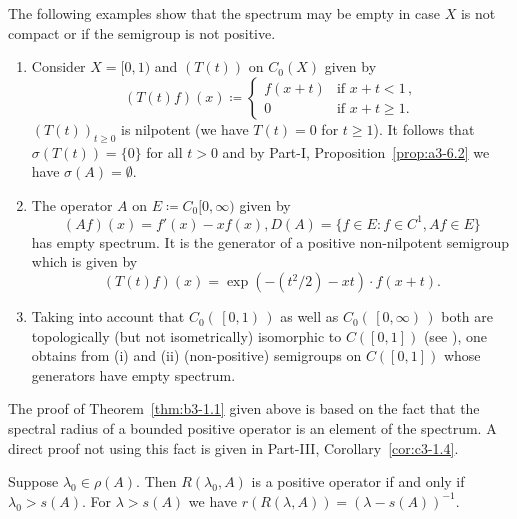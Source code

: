 The following examples show that the spectrum may be empty in case $X$ is not compact or if the semigroup is not positive.
\begin{examples}\label{ex:b3-1.2}
%

\begin{enumerate}[\upshape (i), wide, labelindent=.25em]	
\item  
Consider $X = [0,1)$ and $(T(t))$ on $C_{0}(X)$ given by
%
\begin{equation}\label{eq:b3-1.7}
	(T(t)f)(x) \coloneqq \begin{cases} 
		f(x+t) & \text{if } x+t < 1\,, \\
		0 & \text{if } x+t \geq 1.
	\end{cases}
\end{equation}
$(T(t))_{t\geq 0}$ is nilpotent (we have $T(t) = 0$ for $t \geq 1$).
It follows that $\sigma(T(t)) = \{0\}$ for all $t > 0$ and by Part-I, Proposition~\ref{prop:a3-6.2} we have $\sigma(A) = \emptyset$.

\item 
The operator $A$ on $E \coloneqq C_{0}[0,\infty)$ given by
\begin{equation}\label{eq:b3-1.8}
	(Af)(x) = f'(x) - xf(x), D(A) = \{f \in E \colon f \in C^1, Af \in E\}
\end{equation}
has empty spectrum.
It is the generator of a positive non-nilpotent semigroup which is given by
\begin{equation}\label{eq:b3-1.9}
	(T(t)f)(x) = \exp(-(t^2/2) - xt) \cdot f(x+t).
\end{equation}
	
\item 
Taking into account that $C_{0}( \, \left[ 0 , 1\right) \, )$ as well as 
$C_{0}( \, \left[ 0 , \infty \right) \, )$ both are topologically (but not isometrically) isomorphic to $C(\left[0,1\right])$ (see \textcite[Section~21.5]{semadeni:1971}), one obtains from (i) and (ii) (non-positive) semigroups on $C(\left[0,1\right])$ whose generators have empty spectrum.
\end{enumerate}
\end{examples}
The proof of Theorem~\ref{thm:b3-1.1} given above is based on the fact that the spectral radius of a bounded positive operator is an element of the spectrum.
A direct proof not using this fact is given in Part-III, Corollary~\ref{cor:c3-1.4}.
\begin{corollary}\label{cor:b3-1.3}
	Suppose $\lambda_0 \in \rho(A)$.
	Then $R(\lambda_0,A)$ is a positive operator if and only if\/ $\lambda_0 > s(A)$.
	For $\lambda > s(A)$ we have $r(R(\lambda,A)) = (\lambda - s(A))^{-1}$.
\end{corollary}
